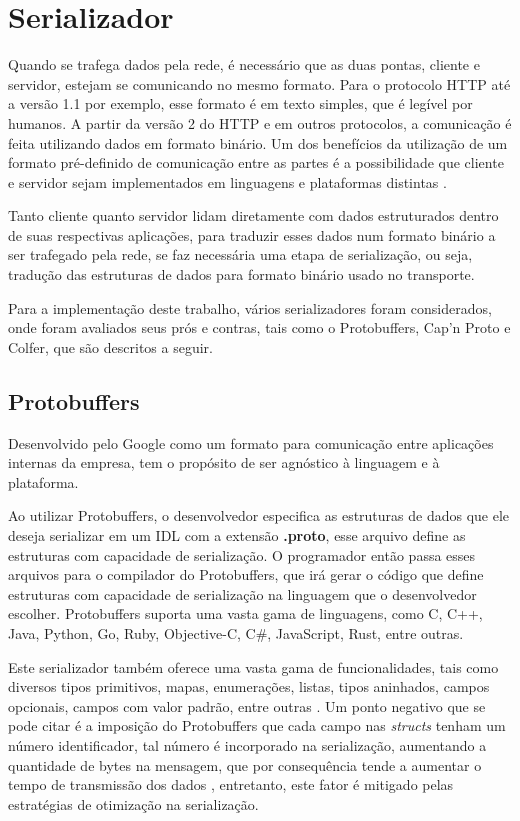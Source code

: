 \section{Serializador}

Quando se trafega dados pela rede, é necessário que as duas pontas, cliente e servidor, estejam se comunicando no mesmo formato. Para o protocolo HTTP até a versão 1.1 por exemplo, esse formato é em texto simples, que é legível por humanos. A partir da versão 2 do HTTP e em outros protocolos, a comunicação é feita utilizando dados em formato binário. Um dos benefícios da utilização de um formato pré-definido de comunicação entre as partes é a possibilidade que cliente e servidor sejam implementados em linguagens e plataformas distintas \cite{slee_thrift_nodate}. 

Tanto cliente quanto servidor lidam diretamente com dados estruturados dentro de suas respectivas aplicações, para traduzir esses dados num formato binário a ser trafegado pela rede, se faz necessária uma etapa de serialização, ou seja, tradução das estruturas de dados para formato binário usado no transporte.

Para a implementação deste trabalho, vários serializadores foram considerados, onde foram avaliados seus prós e contras, tais como o Protobuffers, Cap'n Proto e Colfer, que são descritos a seguir.

\subsection{Protobuffers}

Desenvolvido pelo Google como um formato para comunicação entre aplicações internas da empresa, tem o propósito de ser agnóstico à linguagem e à plataforma.

Ao utilizar Protobuffers, o desenvolvedor especifica as estruturas de dados que ele deseja serializar em um IDL com a extensão \textbf{.proto}, esse arquivo define as estruturas com capacidade de serialização. O programador então passa esses arquivos para o compilador do Protobuffers, que irá gerar o código que define estruturas com capacidade de serialização na linguagem que o desenvolvedor escolher. Protobuffers suporta uma vasta gama de linguagens, como C, C++, Java, Python, Go, Ruby, Objective-C, C\#, JavaScript, Rust, entre outras.

Este serializador também oferece uma vasta gama de funcionalidades, tais como diversos tipos primitivos, mapas, enumerações, listas, tipos aninhados, campos opcionais, campos com valor padrão, entre outras \cite{google_protobuffers_2008}. Um ponto negativo que se pode citar é a imposição do Protobuffers que cada campo nas \textit{structs} tenham um número identificador, tal número é incorporado na serialização, aumentando a quantidade de bytes na mensagem, que por consequência tende a aumentar o tempo de transmissão dos dados \cite{bagci_lightweight_2016}, entretanto, este fator é mitigado pelas estratégias de otimização na serialização.

